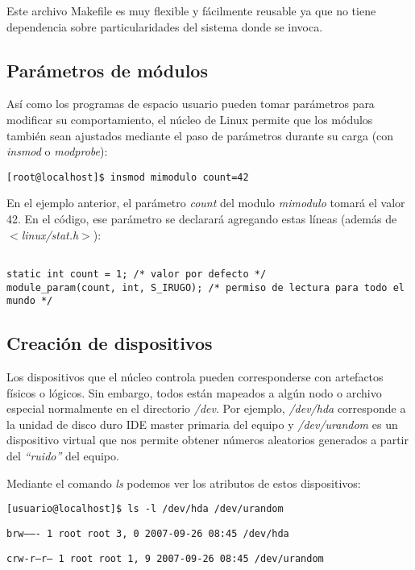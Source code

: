 \documentclass[12pt,a4paper,spanish]{article}
\begin{document}
Este archivo Makefile es muy flexible y fácilmente reusable ya que no tiene dependencia sobre particularidades del sistema donde se invoca.

\subsection{Parámetros de módulos}

Así como los programas de espacio usuario pueden tomar parámetros para modificar su comportamiento, el núcleo de Linux permite que los módulos también sean ajustados mediante el paso de parámetros durante su carga (con \textit{insmod} o \textit{modprobe}):

\begin{flushleft}
\texttt{[root@localhost]\$ insmod mimodulo count=42}
\end{flushleft} 

En el ejemplo anterior, el parámetro \textit{count} del modulo \textit{mimodulo} tomará el valor 42. En el código, ese parámetro se declarará agregando estas líneas (además de \textit{$<$linux/stat.h$>$}):

\begin{small}
\begin{verbatim}

static int count = 1; /* valor por defecto */
module_param(count, int, S_IRUGO); /* permiso de lectura para todo el mundo */

\end{verbatim}
\end{small}

\subsection{Creación de dispositivos}

Los dispositivos que el núcleo controla pueden corresponderse con artefactos físicos o lógicos. Sin embargo, todos están mapeados a algún nodo o archivo especial normalmente en el directorio \textit{/dev}. Por ejemplo, \textit{/dev/hda} corresponde a la unidad de disco duro IDE master primaria del equipo y \textit{/dev/urandom} es un dispositivo virtual que nos permite obtener números aleatorios generados a partir del \textit{``ruido''} del equipo.

Mediante el comando \textit{ls} podemos ver los atributos de estos dispositivos:
\begin{flushleft}
\texttt{[usuario@localhost]\$ ls -l /dev/hda /dev/urandom}

\texttt{brw-------    1 root     root       3,   0 2007-09-26 08:45 /dev/hda}

\texttt{crw-r--r--    1 root     root       1,   9 2007-09-26 08:45 /dev/urandom}
\end{flushleft} 
\end{document}
